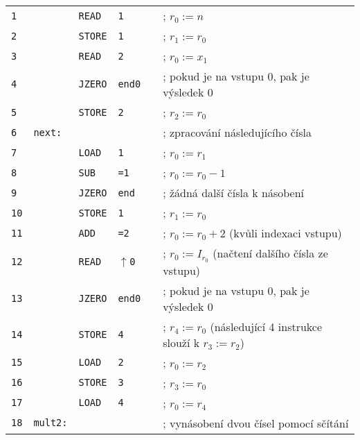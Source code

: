 \documentclass[10pt,a4paper]{article}
\newcommand{\ua}[0]{\uparrow} %
\begin{document}
\vspace{0.5cm}
\begin{tabular}{llllll}
	\texttt{1}  &       & \texttt{READ}  & \texttt{1}      & \qquad & ; $r_{0} := n$ \\
	\texttt{2}  &       & \texttt{STORE} & \texttt{1}      &        & ; $r_{1} := r_{0}$ \\
	\texttt{3}  &       & \texttt{READ}  & \texttt{2}      &        & ; $r_{0} := x_{1}$ \\
	\texttt{4}  &       & \texttt{JZERO} & \texttt{end0}   &        & ; pokud je na vstupu 0, pak je výsledek 0 \\
	\texttt{5}  &       & \texttt{STORE} & \texttt{2}      &        & ; $r_{2} := r_{0}$ \\
	\texttt{6}  & \texttt{next:} &       &                 &        & ; zpracování následujícího čísla \\
	\texttt{7}  &       & \texttt{LOAD}  & \texttt{1}      &        & ; $r_{0} := r_{1}$ \\
	\texttt{8}  &       & \texttt{SUB}   & \texttt{=1}     &        & ; $r_{0} := r_{0} - 1$ \\
	\texttt{9}  &       & \texttt{JZERO} & \texttt{end}    &        & ; žádná další čísla k násobení \\
	\texttt{10} &       & \texttt{STORE} & \texttt{1}      &        & ; $r_{1} := r_{0}$ \\
	\texttt{11} &       & \texttt{ADD}   & \texttt{=2}     &        & ; $r_{0} := r_{0} + 2$ (kvůli indexaci vstupu) \\
	\texttt{12} &       & \texttt{READ}  & \texttt{$\ua$0} &        & ; $r_{0} := I_{r_{0}}$ (načtení dalšího čísla ze vstupu) \\
	\texttt{13} &       & \texttt{JZERO} & \texttt{end0}   &        & ; pokud je na vstupu 0, pak je výsledek 0 \\
	\texttt{14} &       & \texttt{STORE} & \texttt{4}      &        & ; $r_{4} := r_{0}$ (následující 4 instrukce slouží k $r_{3} := r_{2}$) \\
	\texttt{15} &       & \texttt{LOAD}  & \texttt{2}      &        & ; $r_{0} := r_{2}$ \\
	\texttt{16} &       & \texttt{STORE} & \texttt{3}      &        & ; $r_{3} := r_{0}$ \\
	\texttt{17} &       & \texttt{LOAD}  & \texttt{4}      &        & ; $r_{0} := r_{4}$ \\
	\texttt{18} & \texttt{mult2:} &      &                 &        & ; vynásobení dvou čísel pomocí sčítání \\

\end{tabular}
\end{document}
